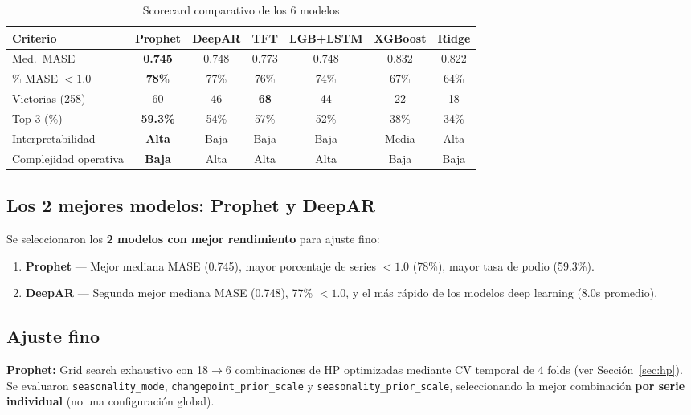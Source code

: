 \documentclass[12pt, letterpaper]{article}
\newcommand{\secref}[1]{Sección~\ref{sec:#1}}
\begin{document}
\begin{table}[H]
\centering
\caption{Scorecard comparativo de los 6 modelos}
\label{tab:scorecard}
\small
\begin{tabularx}{\textwidth}{l *{6}{c}}
\toprule
\textbf{Criterio} & \textbf{Prophet} & \textbf{DeepAR} & \textbf{TFT} & \textbf{LGB+LSTM} & \textbf{XGBoost} & \textbf{Ridge} \\
\midrule
Med.\ MASE           & \cellcolor{lightgreen!50}\textbf{0.745} & 0.748 & 0.773 & 0.748 & 0.832 & 0.822 \\
\% MASE $< 1.0$      & \cellcolor{lightgreen!50}\textbf{78\%}  & 77\%  & 76\%  & 74\%  & 67\%  & 64\%  \\
Victorias (258)       & 60    & 46    & \textbf{68}    & 44    & 22    & 18    \\
Top 3 (\%)            & \cellcolor{lightgreen!50}\textbf{59.3\%} & 54\% & 57\% & 52\% & 38\% & 34\% \\
Interpretabilidad     & \cellcolor{lightgreen!50}\textbf{Alta}  & Baja  & Baja  & Baja  & Media & Alta  \\
Complejidad operativa & \cellcolor{lightgreen!50}\textbf{Baja}  & Alta  & Alta  & Alta  & Baja  & Baja  \\
\bottomrule
\end{tabularx}
\end{table}

\subsection{Los 2 mejores modelos: Prophet y DeepAR}

Se seleccionaron los \textbf{2 modelos con mejor rendimiento} para ajuste fino:

\begin{enumerate}[noitemsep]
    \item \textbf{Prophet} — Mejor mediana MASE (0.745), mayor porcentaje de series $< 1.0$ (78\%), mayor tasa de podio (59.3\%).
    \item \textbf{DeepAR} — Segunda mejor mediana MASE (0.748), 77\% $< 1.0$, y el más rápido de los modelos deep learning (8.0s promedio).
\end{enumerate}

\subsection{Ajuste fino}

\textbf{Prophet:} Grid search exhaustivo con 18$\to$6 combinaciones de HP optimizadas mediante CV temporal de 4 folds (ver \secref{hp}). Se evaluaron \texttt{seasonality\_mode}, \texttt{changepoint\_prior\_scale} y \texttt{seasonality\_prior\_scale}, seleccionando la mejor combinación \textbf{por serie individual} (no una configuración global).
\end{document}
